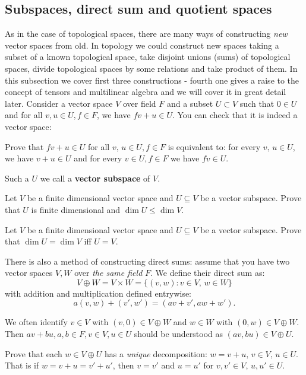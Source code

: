 \subsection{Subspaces, direct sum and quotient spaces}
As in the case of topological spaces, there are many ways of constructing \textit{new} vector spaces from old. In topology we could construct
new spaces taking a subset of a known topological space, take disjoint unions (sums) of topological spaces, divide topological spaces by some relations
and take product of them. In this subsection we cover first three constructions - fourth one gives a raise to the concept of tensors and multilinear algebra and we will cover
it in great detail later.
Consider a vector space $V$ over field $F$ and a subset $U\subset V$ such that $0\in U$ and for all $v, u\in U, f\in F$, we have $fv+u\in U$. You can check that it is indeed a vector space:
\begin{prob}
  Prove that $fv+u\in U$ for all $v,\, u\in U, f\in F$ is equivalent to: for every $v,\, u\in U$, we have $v+u\in U$ and for every $v\in U, f\in F$ we have $fv\in U$.
\end{prob}

Such a $U$ we call a \textbf{vector subspace} of $V$.

\begin{prob}
  Let $V$ be a finite dimensional vector space and $U\subseteq V$ be a vector subspace. Prove that $U$ is finite dimensional and $\dim U\le \dim V.$
\end{prob}

\begin{prob}
  Let $V$ be a finite dimensional vector space and $U\subseteq V$ be a vector subspace. Prove that $\dim U=\dim V$ iff $U=V$.
\end{prob}

There is also a method of constructing direct sums: assume that you have two vector spaces $V, W$ over \textit{the same field} $F$. We define their direct sum as:
$$V\oplus W=V\times W = \{(v,w) : v\in V,\, w\in W\}$$
with addition and multiplication defined entrywise:
$$a(v,w)+(v', w')=(av+v', aw+w').$$

We often identify $v\in V$ with $(v,0)\in V\oplus W$ and $w\in W$ with $(0,w)\in V\oplus W$. Then $av+bu, a,b\in F, v\in V, u\in U$ should be understood as $(av, bu)\in V\oplus U$.

\begin{prob}
  Prove that each $w\in V\oplus U$ has a \textit{unique} decomposition: $w=v+u,\, v\in V,\,u\in U$. That is if $w=v+u=v'+u'$, then $v=v'$ and $u=u'$ for $v,v'\in V,\, u,u'\in U$.
\end{prob}


